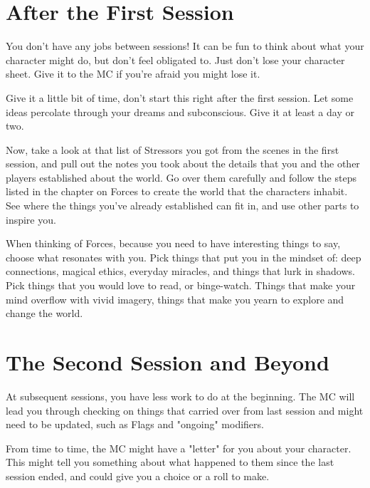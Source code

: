 \documentclass[
  oneside,
  statementpaper,
  9pt]{memoir}
\begin{document}
\hypertarget{after-the-first-session}{%
\section{After the First Session}\label{after-the-first-session}}

\begin{Player}

You don't have any jobs between sessions! It can be fun to think about what your character might do, but don't feel obligated to. Just don't lose your character sheet. Give it to the MC if you're afraid you might lose it.

\end{Player}

\begin{MC}

Give it a little bit of time, don’t start this right after the first session. Let some ideas percolate through your dreams and subconscious. Give it at least a day or two.

Now, take a look at that list of Stressors you got from the scenes in the first session, and pull out the notes you took about the details that you and the other players established about the world. Go over them carefully and follow the steps listed in the chapter on Forces to create the world that the characters inhabit. See where the things you’ve already established can fit in, and use other parts to inspire you.

When thinking of Forces, because you need to have interesting things to say, choose what resonates with you. Pick things that put you in the mindset of: deep connections, magical ethics, everyday miracles, and things that lurk in shadows. Pick things that you would love to read, or binge-watch. Things that make your mind overflow with vivid imagery, things that make you yearn to explore and change the world.

\end{MC}

\hypertarget{the-second-session-and-beyond}{%
\section{The Second Session and
Beyond}\label{the-second-session-and-beyond}}

\begin{Player}

At subsequent sessions, you have less work to do at the beginning. The MC will lead you through checking on things that carried over from last session and might need to be updated, such as Flags and "ongoing" modifiers.

From time to time, the MC might have a "letter" for you about your character. This might tell you something about what happened to them since the last session ended, and could give you a choice or a roll to make.

\end{Player}
\end{document}
